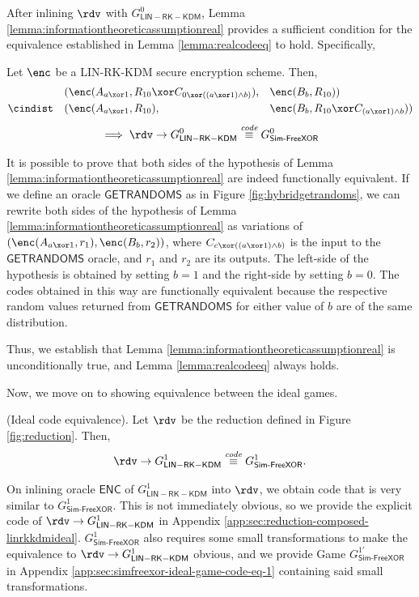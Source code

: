 After inlining $\rdv$ with $G^{0}_{\mathsf{LIN-RK-KDM}}$, Lemma \ref{lemma:informationtheoreticassumptionreal} provides a sufficient condition for the equivalence established in Lemma \ref{lemma:realcodeeq} to hold. Specifically, 
\begin{lemma}\label{lemma:informationtheoreticassumptionreal}
    Let $\enc$ be a LIN-RK-KDM secure encryption scheme. Then,
    \[
    \begin{aligned}
        &(\enc(A_{a\xor 1}, R_{10} \xor C_{0\xor((a\xor 1) \land b)}),
        &&\enc(B_b, R_{10})) \\
        \cindist\quad &(\enc(A_{a\xor 1}, R_{10}),
        &&\enc(B_b, R_{10}           \xor C_{({a\xor 1})\land b}))
    \end{aligned}
    \]
    \[\implies \rdv\to G^{0}_{\mathsf{LIN-RK-KDM}} \codeequiv G^0_\mathsf{Sim\text{-}FreeXOR} \]
\end{lemma} 
It is possible to prove that both sides of the hypothesis of Lemma \ref{lemma:informationtheoreticassumptionreal} are indeed functionally equivalent. If we define an oracle $\mathsf{GETRANDOMS}$ as in Figure \ref{fig:hybridgetrandoms}, we can rewrite both sides of the hypothesis of Lemma \ref{lemma:informationtheoreticassumptionreal} as variations of $(\enc(A_{a\xor 1}, r_1), \enc(B_{b}, r_2))$, where $C_{c\xor((a\xor 1) \land b)}$ is the input to the $\mathsf{GETRANDOMS}$ oracle, and $r_1$ and $r_2$ are its outputs. The left-side of the hypothesis is obtained by setting $b=1$ and the right-side by setting $b=0$. The codes obtained in this way are functionally equivalent because the respective random values returned from $\mathsf{GETRANDOMS}$ for either value of $b$ are of the same distribution. 

Thus, we establish that Lemma \ref{lemma:informationtheoreticassumptionreal} is unconditionally true, and Lemma \ref{lemma:realcodeeq} always holds.

Now, we move on to showing equivalence between the ideal games. 
\begin{lemma}\label{lemma:idealcodeeq}\textnormal{(Ideal code equivalence).}
    Let $\rdv$ be the reduction defined in Figure \ref{fig:reduction}. Then, 
    \[ \rdv \to G^{1}_{\mathsf{LIN-RK-KDM}} \codeequiv G^1_{\mathsf{Sim\text{-}FreeXOR}}\text{.}
\]
\end{lemma}
On inlining oracle $\mathsf{ENC}$ of $G^{1}_{\mathsf{LIN-RK-KDM}}$ into $\rdv$, we obtain code that is very similar to $G^1_{\mathsf{Sim\text{-}FreeXOR}}$. This is not immediately obvious, so we provide the explicit code of $\rdv \to G^{1}_{\mathsf{LIN-RK-KDM}}$ in Appendix \ref{app:sec:reduction-composed-linrkkdmideal}. $G^{1}_\mathsf{Sim\text{-}FreeXOR}$ also requires some small transformations to make the equivalence to $\rdv \to G^{1}_{\mathsf{LIN-RK-KDM}}$ obvious, and we provide Game $G^{1\prime}_\mathsf{Sim\text{-}FreeXOR}$ in Appendix \ref{app:sec:simfreexor-ideal-game-code-eq-1} containing said small transformations. 

